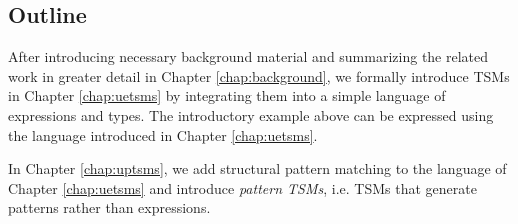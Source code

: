 

\subsection{Outline}

After introducing necessary background material and summarizing the related work in greater detail in Chapter \ref{chap:background}, we formally introduce TSMs in Chapter \ref{chap:uetsms} by integrating them into a simple language of expressions and types. The introductory example above can be expressed using the language introduced in Chapter \ref{chap:uetsms}. 


In Chapter \ref{chap:uptsms}, we add structural pattern matching to the language of Chapter \ref{chap:uetsms} and introduce \emph{pattern TSMs}, i.e. TSMs that generate patterns rather than expressions.


